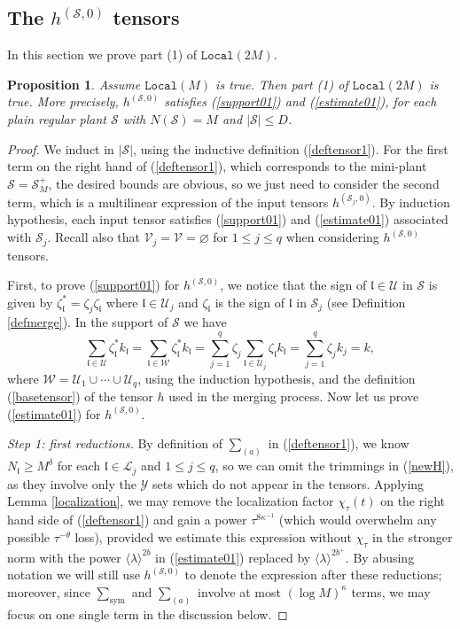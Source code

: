 \documentclass[11 pt,reqno]{amsart}
\newtheorem{prop}[thm]{Proposition}
\theoremstyle{definition}
\theoremstyle{remark}
\numberwithin{equation}{section}
\newcommand{\Sc}{\mathcal{S}}
\newcommand{\Lc}{\mathcal{L}}
\newcommand{\Uc}{\mathcal{U}}
\newcommand{\Vc}{\mathcal{V}}
\newcommand{\Wc}{\mathcal{W}}
\newcommand{\Yc}{\mathcal{Y}}
\newcommand{\lf}{\mathfrak{l}}
\begin{document}
{\subsection{The $h^{(\Sc,0)}$ tensors} In this section we prove part (1) of $\mathtt{Local}(2M)$.
\begin{prop}\label{induct1} Assume $\mathtt{Local}(M)$ is true. Then part (1) of $\mathtt{Local}(2M)$ is true. More precisely, $h^{(\Sc,0)}$ satisfies (\ref{support01}) and (\ref{estimate01}), for each plain regular plant $\Sc$ with $N(\Sc)=M$ and $|\Sc|\leq D$.
\end{prop}
\begin{proof} We induct in $|\Sc|$, using the inductive definition (\ref{deftensor1}). For the first term on the right hand of (\ref{deftensor1}), which corresponds to the mini-plant $\Sc=\Sc_M^+$, the desired bounds are obvious, so we just need to consider the second term, which is a multilinear expression of the input tensors $h^{(\Sc_j,0)}$. By induction hypothesis, each input tensor satisfies (\ref{support01}) and (\ref{estimate01}) associated with $\Sc_j$. Recall also that $\Vc_j=\Vc=\varnothing$ for $1\leq j\leq q$ when considering $h^{(\Sc,0)}$ tensors.

First, to prove (\ref{support01}) for $h^{(\Sc,0)}$, we notice that the sign of $\lf\in\Uc$ in $\Sc$ is given by $\zeta_\lf^*=\zeta_j\zeta_\lf$ where $\lf\in\Uc_j$ and $\zeta_\lf$ is the sign of $\lf$ in $\Sc_j$ (see Definition \ref{defmerge}). In the support of $\Sc$ we have
\begin{equation}\label{cencelnew}\sum_{\lf\in\Uc}\zeta_\lf^* k_\lf=\sum_{\lf\in\Wc}\zeta_\lf^* k_\lf=\sum_{j=1}^q\zeta_j\sum_{\lf\in\Uc_j}\zeta_\lf k_\lf=\sum_{j=1}^q\zeta_jk_j=k,\end{equation} where $\Wc=\Uc_1\cup\cdots\cup\Uc_q$, using the induction hypothesis, and the definition (\ref{basetensor}) of the tensor $h$ used in the merging process. Now let us prove (\ref{estimate01}) for $h^{(\Sc,0)}$.

\emph{Step 1: first reductions.} By definition of $\sum_{(a)}$ in (\ref{deftensor1}), we know $N_\lf\geq M^\delta$ for each $\lf\in\Lc_j$ and $1\leq j\leq q$, so we can omit the trimmings in (\ref{newH}), as they involve only the $\Yc$ sets which do not appear in the tensors. Applying Lemma \ref{localization}, we may remove the localization factor $\chi_\tau(t)$ on the right hand side of (\ref{deftensor1}) and gain a power $\tau^{8\kappa^{-1}}$ (which would overwhelm any possible $\tau^{-\theta}$ loss), provided we estimate this expression without $\chi_\tau$ in the stronger norm with the power $\langle\lambda\rangle^{2b}$ in (\ref{estimate01}) replaced by $\langle\lambda\rangle^{2b^+}$. By abusing notation we will still use $h^{(\Sc,0)}$ to denote the expression after these reductions; moreover, since $\sum_{\mathrm{sym}}$ and $\sum_{(a)}$ involve at most $(\log M)^{\kappa}$ terms, we may focus on one single term in the discussion below.


\end{proof}}
\end{document}
